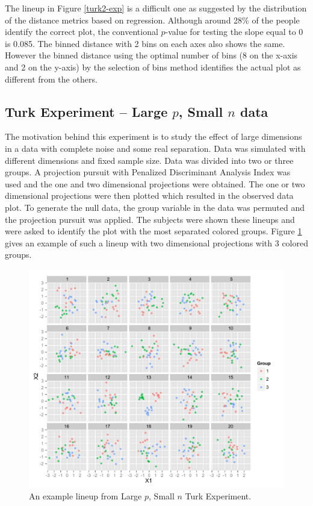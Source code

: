 \documentclass[12]{article}
\begin{document}
The lineup in Figure \ref{turk2-exp} is a difficult one as suggested by the distribution of the distance metrics based on regression. Although around 28\% of the people identify the correct plot, the conventional $p$-value for testing the slope equal to 0 is 0.085. The binned distance with 2 bins on each axes also shows the same. However the binned distance using the optimal number of bins (8 on the x-axis and 2 on the y-axis) by the selection of bins method identifies the actual plot as different from the others. 

\subsection{Turk Experiment -- Large $p$, Small $n$ data}

The motivation behind this experiment is to study the effect of large dimensions in a data with complete noise and some real separation. Data was simulated with different dimensions and fixed sample size. Data was divided into two or three groups. A projection pursuit with Penalized Discriminant Analysis Index was used and the one and two dimensional projections were obtained. The one or two dimensional projections were then plotted which resulted in the observed data plot. To generate the null data, the group variable in the data was permuted and the projection pursuit was applied. The subjects were shown these lineups and were asked to identify the plot with the most separated colored groups. Figure \ref{largep} gives an example of such a lineup with two dimensional projections with 3 colored groups. 

\begin{figure}[htbp]
\centering
\includegraphics[width=.7\textwidth]{largep-example.pdf}
\caption{An example lineup from Large $p$, Small $n$ Turk Experiment.}
\label{largep}
\end{figure}
\end{document}
